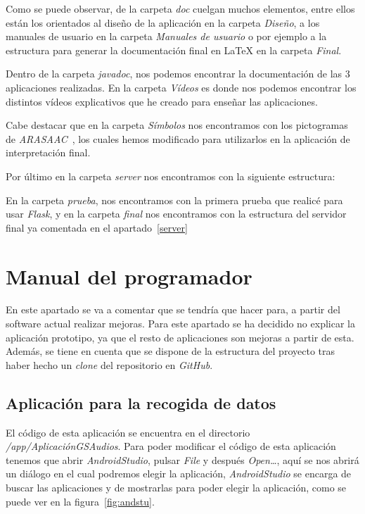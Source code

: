 Como se puede observar, de la carpeta \textit{doc} cuelgan muchos elementos, entre ellos están los orientados al diseño de la aplicación en la carpeta \textit{Diseño}, a los manuales de usuario en la carpeta \textit{Manuales de usuario} o por ejemplo a la estructura para generar la documentación final en \LaTeX{} en la carpeta \textit{Final}.

Dentro de la carpeta \textit{javadoc}, nos podemos encontrar la documentación de las 3 aplicaciones realizadas. En la carpeta \textit{Vídeos} es donde nos podemos encontrar los distintos vídeos explicativos que he creado para enseñar las aplicaciones.

Cabe destacar que en la carpeta \textit{Símbolos} nos encontramos con los pictogramas de \textit{ARASAAC}~\cite{arasaac}, los cuales hemos modificado para utilizarlos en la aplicación de interpretación final.

Por último en la carpeta \textit{server} nos encontramos con la siguiente estructura:

En la carpeta \textit{prueba}, nos encontramos con la primera prueba que realicé para usar \textit{Flask}, y en la carpeta \textit{final} nos encontramos con la estructura del servidor final ya comentada en el apartado~\ref{server}
\section{Manual del programador}
En este apartado se va a comentar que se tendría que hacer para, a partir del software actual realizar mejoras. Para este apartado se ha decidido no explicar la aplicación prototipo, ya que el resto de aplicaciones son mejoras a partir de esta. Además, se tiene en cuenta que se dispone de la estructura del proyecto tras haber hecho un \textit{clone} del repositorio en \textit{GitHub}.
\subsection{Aplicación para la recogida de datos}
El código de esta aplicación se encuentra en el directorio \textit{/app/AplicaciónGSAudios}. Para poder modificar el código de esta aplicación tenemos que abrir \textit{AndroidStudio}, pulsar \textit{File} y después \textit{Open\ldots}, aquí se nos abrirá un diálogo en el cual podremos elegir la aplicación, \textit{AndroidStudio} se encarga de buscar las aplicaciones y de mostrarlas para poder elegir la aplicación, como se puede ver en la figura~\ref{fig:andstu}.

